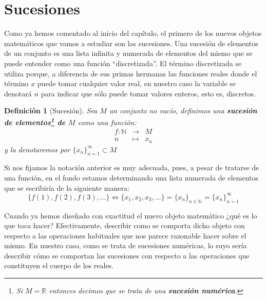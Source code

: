 \documentclass[10pt,a4paper,openright]{book}
\theoremstyle{break}
\newtheorem{defi}{Definición}[chapter]
\begin{document}
\section{Sucesiones}
Como ya hemos comentado al inicio del capítulo, el primero de los nuevos objetos matemáticos que vamos a estudiar son las sucesiones. Una sucesión de elementos de un conjunto es una lista infinita y numerada de elementos del mismo que se puede entender como una función ``discretizada''. El término discretizada se utiliza porque, a diferencia de sus primas hermanas las funciones reales donde el término $x$ puede tomar cualquier valor real, en nuestro caso la variable se denotará $n$ para indicar que sólo puede tomar valores enteros, esto es, discretos.

\begin{defi}[Sucesión]
Sea $M$ un conjunto no vacío, definimos una \textbf{sucesión de elementos\footnote{Si $M=\mathbb R$ entonces decimos que se trata de una \textbf{sucesión numérica}.} de $M$} como una función:
\begin{eqnarray*}
f: \mathbb N &\rightarrow& M \\
n &\longmapsto& x_n
\end{eqnarray*}
y la denotaremos por $\{x_n\}_{n=1}^\infty\subset M$
\end{defi}

Si nos fijamos la notación anterior es muy adecuada, pues, a pesar de tratarse de una función, en el fondo estamos determinando una lista numerada de elementos que se escribiría de la siguiente manera:
\[
\{f(1),f(2),f(3), ...\}\Leftrightarrow \{x_1,x_2,x_3,...\}=\{x_n\}_{n\in \mathbb N}=\{x_n\}_{n=1}^{\infty}
\]

Cuando ya hemos diseñado con exactitud el nuevo objeto matemático ¿qué es lo que toca hacer? Efectivamente, describir como se comporta dicho objeto con respecto a las operaciones habituales que nos parece razonable hacer sobre el mismo. En nuestro caso, como se trata de sucesiones numéricas, lo suyo sería describir cómo se comportan las sucesiones con respecto a las operaciones que constituyen el cuerpo de los reales.
\end{document}
